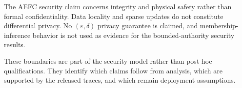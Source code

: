 The AEFC security claim concerns integrity and physical safety rather than formal confidentiality. Data locality and sparse updates do not constitute differential privacy. No $(\varepsilon,\delta)$ privacy guarantee is claimed, and membership-inference behavior is not used as evidence for the bounded-authority security results.

These boundaries are part of the security model rather than post hoc qualifications. They identify which claims follow from analysis, which are supported by the released traces, and which remain deployment assumptions.
